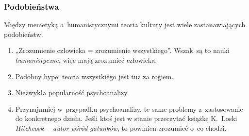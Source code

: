 \documentclass[10pt,t]{beamer}
\begin{document}
\begin{frame}
  \frametitle{Podobieństwa}


  Między memetyką a~humanistycznymi teoria kultury jest wiele
  zastanawiających podobieństw.
  \begin{enumerate}

  \item „Zrozumienie człowieka = zrozumienie wszystkiego”.
    Wszak~są to nauki \textit{humanistyczne}, więc mają zrozumieć
    człowieka.

  \item Podobny hype: teoria wszystkiego jest tuż za rogiem.

  \item Niezwykła popularność psychoanalizy.

  \item Przynajmniej w~przypadku psychoanalizy, te same problemy
    z~zastosowanie do konkretnego dzieła. Jeśli ktoś jest w stanie
    przeczytać książkę K.~Loski \textit{Hitchcock~-- autor wśród gatunków},
    to powinien zrozumieć o~co chodzi.

  \end{enumerate}

\end{frame}





\end{document}
